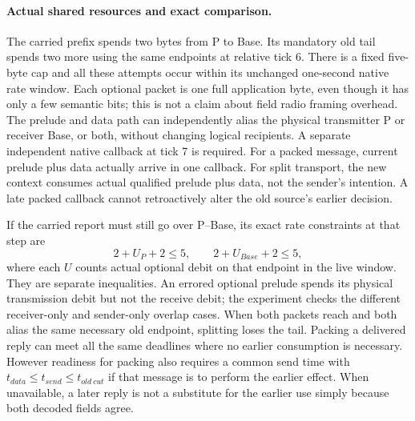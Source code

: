 \documentclass[11pt]{article}
\begin{document}
\paragraph{Actual shared resources and exact comparison.}
The carried prefix spends two bytes from P to Base. Its
mandatory old tail spends two more using the same endpoints
at relative tick 6. There is a fixed five-byte cap and all these
attempts occur within its unchanged one-second native rate window.
Each optional packet is one full application byte, even
though it has only a few semantic bits; this is not a claim
about field radio framing overhead. The prelude and data path
can independently alias the physical transmitter P or receiver
Base, or both, without changing logical recipients.
A separate independent native callback at tick 7 is required.
For a packed message, current prelude plus data actually
arrive in one callback. For split transport, the new context
consumes actual qualified prelude plus data, not the sender's
intention. A late packed callback cannot retroactively alter the
old source's earlier decision.

If the carried report must still go over P--Base, its exact
rate constraints at that step are
\[
2+U_P+2\leq5,\qquad 2+U_{Base}+2\leq5,
\]
where each $U$ counts actual optional debit on that endpoint
in the live window. They are separate inequalities. An
errored optional prelude spends its physical transmission
debit but not the receive debit; the experiment checks the
different receiver-only and sender-only overlap cases.
When both packets reach and both alias the same necessary
old endpoint, splitting loses the tail. Packing a delivered
reply can meet all the same deadlines where no earlier
consumption is necessary. However readiness for packing also
requires a common send time with $t_{data}\leq t_{send}
\leq t_{old\:cut}$ if that message is to perform the earlier
effect. When unavailable, a later reply is not a substitute
for the earlier use simply because both decoded fields agree.
\end{document}
